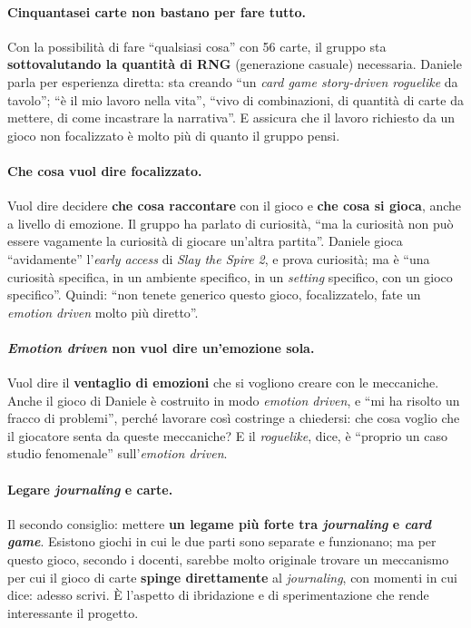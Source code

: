 \paragraph{Cinquantasei carte non bastano per fare tutto.} Con la possibilità di fare
``qualsiasi cosa'' con 56 carte, il gruppo sta \textbf{sottovalutando la quantità di RNG}
(generazione casuale) necessaria. Daniele parla per esperienza diretta: sta creando
``un \emph{card game story-driven roguelike} da tavolo''; ``è il mio lavoro nella vita'',
``vivo di combinazioni, di quantità di carte da mettere, di come incastrare la
narrativa''. E assicura che il lavoro richiesto da un gioco non focalizzato è molto più
di quanto il gruppo pensi.

\paragraph{Che cosa vuol dire focalizzato.} Vuol dire decidere \textbf{che cosa
raccontare} con il gioco e \textbf{che cosa si gioca}, anche a livello di emozione. Il
gruppo ha parlato di curiosità, ``ma la curiosità non può essere vagamente la curiosità
di giocare un'altra partita''. Daniele gioca ``avidamente'' l'\emph{early access} di
\emph{Slay the Spire 2}, e prova curiosità; ma è ``una curiosità specifica, in un
ambiente specifico, in un \emph{setting} specifico, con un gioco specifico''. Quindi:
``non tenete generico questo gioco, focalizzatelo, fate un \emph{emotion driven} molto
più diretto''.

\paragraph{\emph{Emotion driven} non vuol dire un'emozione sola.} Vuol dire il
\textbf{ventaglio di emozioni} che si vogliono creare con le meccaniche. Anche il gioco
di Daniele è costruito in modo \emph{emotion driven}, e ``mi ha risolto un fracco di
problemi'', perché lavorare così costringe a chiedersi: che cosa voglio che il giocatore
senta da queste meccaniche? E il \emph{roguelike}, dice, è ``proprio un caso studio
fenomenale'' sull'\emph{emotion driven}.

\paragraph{Legare \emph{journaling} e carte.} Il secondo consiglio: mettere \textbf{un
legame più forte tra \emph{journaling} e \emph{card game}}. Esistono giochi in cui le due
parti sono separate e funzionano; ma per questo gioco, secondo i docenti, sarebbe molto
originale trovare un meccanismo per cui il gioco di carte \textbf{spinge direttamente}
al \emph{journaling}, con momenti in cui dice: adesso scrivi. È l'aspetto di ibridazione
e di sperimentazione che rende interessante il progetto.

